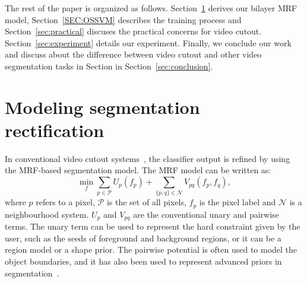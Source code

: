 \documentclass[10pt,journal,compsoc]{newIEEEtran}
\begin{document}
The rest of the paper is organized as follows. Section~\ref{sec:bilayerMRF} derives our bilayer MRF model, Section~\ref{SEC:OSSVM} describes the training process and Section~\ref{sec:practical} discuses the practical concerns for video cutout. Section~\ref{sec:experiment} details our experiment. Finally, we conclude our work and discuss about the difference between video cutout and other video segmentation tasks in Section in Section~\ref{sec:conclusion}.


%
\section{Modeling segmentation rectification}\label{sec:bilayerMRF}%

In conventional video cutout systems~\cite{Bai09VideoSnapCut_SIGGRAPH,Zhong2012UDC_SIGGRAPHAsia}, the classifier output is refined by using the MRF-based segmentation model. The MRF model can be written as:
\begin{equation}\label{eqn:MRF_prior}
\min_{f} \sum_{p\in\mathcal{P}} U_{p}(f_p) + \sum_{\{p,q\}\in \mathcal{N}} V_{pq}(f_p,f_q), %
\end{equation}
where $p$ refers to a  pixel, $\mathcal{P}$ is the set of all pixels, $f_p$ is the pixel label and $\mathcal{N}$ is a neighbourhood system. $U_p$ and $V_{pq}$ are the conventional unary and pairwise terms. The unary term can be used to represent the hard constraint given by the user, such as the seeds of foreground and background regions, or it can be a region model or a shape prior. The pairwise potential is often used to model the object boundaries, and it has also been used to represent advanced priors in segmentation~\cite{Veksler08StarShapePrior}.
\end{document}
